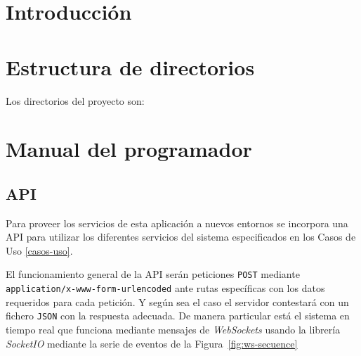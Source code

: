 
\section{Introducción}

\section{Estructura de directorios}

Los directorios del proyecto son:


\section{Manual del programador}

\subsection{API}
Para proveer los servicios de esta aplicación a nuevos entornos se incorpora una API para utilizar los diferentes servicios del sistema especificados en los Casos de Uso \ref{casos-uso}.

El funcionamiento general de la API serán peticiones \texttt{POST} mediante \texttt{application/x-www-form-urlencoded} ante rutas específicas con los datos requeridos para cada petición. Y según sea el caso el servidor contestará con un fichero \texttt{JSON} con la respuesta adecuada. De manera particular está el sistema en tiempo real que funciona mediante mensajes de \textit{WebSockets}\cite{wiki:websocket} usando la librería \textit{SocketIO}\cite{tool:socketio} mediante la serie de eventos de la Figura~\ref{fig:ws-secuence}

